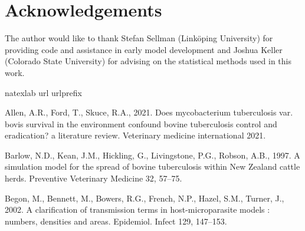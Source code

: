 \documentclass[number,preprint,review,12pt]{elsarticle}
\begin{document}
\section{Acknowledgements} The author would like to thank Stefan Sellman (Link\"{o}ping University) for providing code and assistance in early model development and Joshua Keller (Colorado State University) for advising on the statistical methods used in this work. 
\pagebreak



\pagebreak




%


\begin{thebibliography}{31}
\expandafter\ifx\csname natexlab\endcsname\relax\def\natexlab#1{#1}\fi
\expandafter\ifx\csname url\endcsname\relax
  \def\url#1{\texttt{#1}}\fi
\expandafter\ifx\csname urlprefix\endcsname\relax\def\urlprefix{URL }\fi
\providecommand{\eprint}[2][]{\url{#2}}
\providecommand{\bibinfo}[2]{#2}
\ifx\xfnm\relax \def\xfnm[#1]{\unskip,\space#1}\fi

\bibinfo{author}{Allen, A.R.}, \bibinfo{author}{Ford, T.},
  \bibinfo{author}{Skuce, R.A.}, \bibinfo{year}{2021}.
\newblock \bibinfo{title}{Does mycobacterium tuberculosis var. bovis survival
  in the environment confound bovine tuberculosis control and eradication? a
  literature review}.
\newblock \bibinfo{journal}{Veterinary medicine international}
  \bibinfo{volume}{2021}.
  
\bibinfo{author}{Barlow, N.D.}, \bibinfo{author}{Kean, J.M.},
  \bibinfo{author}{Hickling, G.}, \bibinfo{author}{Livingstone, P.G.},
  \bibinfo{author}{Robson, A.B.}, \bibinfo{year}{1997}.
\newblock \bibinfo{title}{A simulation model for the spread of bovine
  tuberculosis within New Zealand cattle herds}.
\newblock \bibinfo{journal}{Preventive Veterinary Medicine}
  \bibinfo{volume}{32}, \bibinfo{pages}{57--75}.

\bibinfo{author}{Begon, M.}, \bibinfo{author}{Bennett, M.},
  \bibinfo{author}{Bowers, R.G.}, \bibinfo{author}{French, N.P.},
  \bibinfo{author}{Hazel, S.M.}, \bibinfo{author}{Turner, J.},
  \bibinfo{year}{2002}.
\newblock \bibinfo{title}{A clarification of transmission terms in
  host-microparasite models : numbers, densities and areas}.
\newblock \bibinfo{journal}{Epidemiol. Infect} \bibinfo{volume}{129},
  \bibinfo{pages}{147--153}.


\end{thebibliography}
\end{document}
